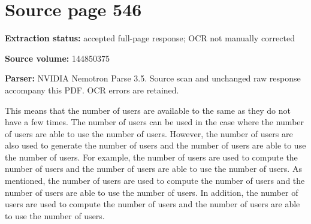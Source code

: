 \clearpage
\section{Source page 546}
\textbf{Extraction status:} accepted full-page response; OCR not manually corrected\par
\textbf{Source volume:} 144850375\par
\textbf{Parser:} NVIDIA Nemotron Parse 3.5. Source scan and unchanged raw response accompany this PDF. OCR errors are retained.\par\medskip
This means that the number of users are available to the same as they do not have a few times. The number of users can be used in the case where the number of users are able to use the number of users. However, the number of users are also used to generate the number of users and the number of users are able to use the number of users. For example, the number of users are used to compute the number of users and the number of users are able to use the number of users. As mentioned, the number of users are used to compute the number of users and the number of users are able to use the number of users. In addition, the number of users are used to compute the number of users and the number of users are able to use the number of users.\par\medskip

